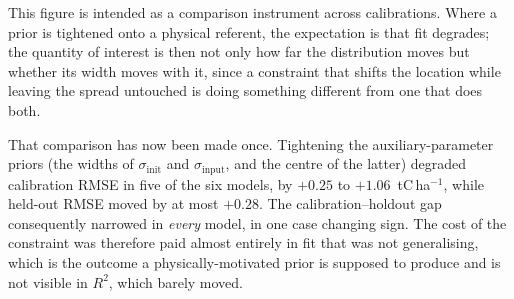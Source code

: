 \documentclass[../HIKET_draft_v1.tex]{subfiles}
\begin{document}
This figure is intended as a comparison instrument across calibrations. Where a
prior is tightened onto a physical referent, the expectation is that fit degrades;
the quantity of interest is then not only how far the distribution moves but
whether its width moves with it, since a constraint that shifts the location while
leaving the spread untouched is doing something different from one that does both.

That comparison has now been made once. Tightening the auxiliary-parameter priors
(the widths of $\sigma_{\text{init}}$ and $\sigma_{\text{input}}$, and the centre of
the latter) degraded calibration RMSE in five of the six models, by $+0.25$ to
$+1.06$~tC\,ha$^{-1}$, while held-out RMSE moved by at most $+0.28$. The
calibration--holdout gap consequently narrowed in \emph{every} model, in one case
changing sign. The cost of the constraint was therefore paid almost entirely in fit
that was not generalising, which is the outcome a physically-motivated prior is
supposed to produce and is not visible in $R^{2}$, which barely moved.
\end{document}
